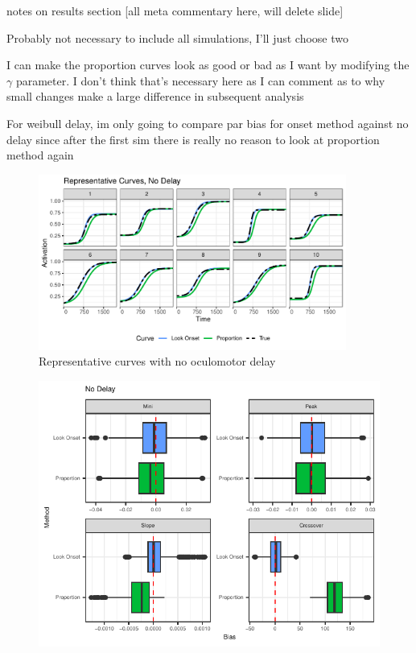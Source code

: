 \documentclass{beamer}
\newcommand{\vp}{\vspace{2mm}}
\begin{document}
\begin{frame}{notes on results section}
[all meta commentary here, will delete slide] \vp

Probably not necessary to include all simulations, I'll just choose two \vp

I can make the proportion curves look as good or bad as I want by modifying  the $\gamma$ parameter. I don't think that's necessary here as I can comment as to why small changes make a large difference in subsequent analysis \vp

For weibull delay, im only going to compare par bias for onset method against no delay since after the first sim there is really no reason to look at proportion method again
\end{frame}


\begin{frame}
\begin{figure}[H]
\centering
\includegraphics[width=0.9\textwidth]{rep_curves_no_delay.pdf}
\caption{Representative curves with no oculomotor delay}
\label{fig:rep_curves_no_delay}
\end{figure}
\end{frame}


\begin{frame}
\begin{figure}[H]
\centering
\includegraphics{no_delay_bar_plot.pdf}
\label{fig:par_bias_no_delay}
\end{figure}
\end{frame}
\end{document}
